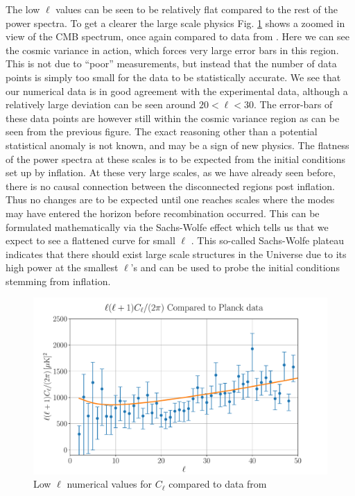 \documentclass[%
reprint,
 amsmath,amssymb,
 aps,
]{revtex4-2}
\begin{document}
The low $\ell$ values can be seen to be relatively flat compared to the rest of the power spectra. To get a clearer the large scale physics Fig. \ref{fig:low_C_ell_vs_Planck} shows a zoomed in view of the CMB spectrum, once again compared to data from \cite{Planck:2018vyg}. Here we can see the cosmic variance in action, which forces very large error bars in this region. This is not due to ``poor'' measurements, but instead that the number of data points is simply too small for the data to be statistically accurate. We see that our numerical data is in good agreement with the experimental data, although a relatively large deviation can be seen around $20<\ell<30$. The error-bars of these data points are however still within the cosmic variance region as can be seen from the previous figure. The exact reasoning other than a potential statistical anomaly is not known, and may be a sign of new physics. The flatness of the power spectra at these scales is to be expected from the initial conditions set up by inflation. At these very large scales, as we have already seen before, there is no causal connection between the disconnected regions post inflation. Thus no changes are to be expected until one reaches scales where the modes may have entered the horizon before recombination occurred. This can be formulated mathematically via the Sachs-Wolfe effect which tells us that we expect to see a flattened curve for small $\ell$ \cite{Dodelson:2003ft}. This so-called Sachs-Wolfe plateau indicates that there should exist large scale structures in the Universe due to its high power at the smallest $\ell$'s and can be used to probe the initial conditions stemming from inflation.
\begin{figure}[ht!]
	\includegraphics[width = \linewidth]{Figures/low_C_ell_vs_Planck.pdf}
	\caption{Low $\ell$ numerical values for $C_\ell$ compared to data from \cite{Planck:2018vyg}}
	\label{fig:low_C_ell_vs_Planck}
\end{figure}
\end{document}
